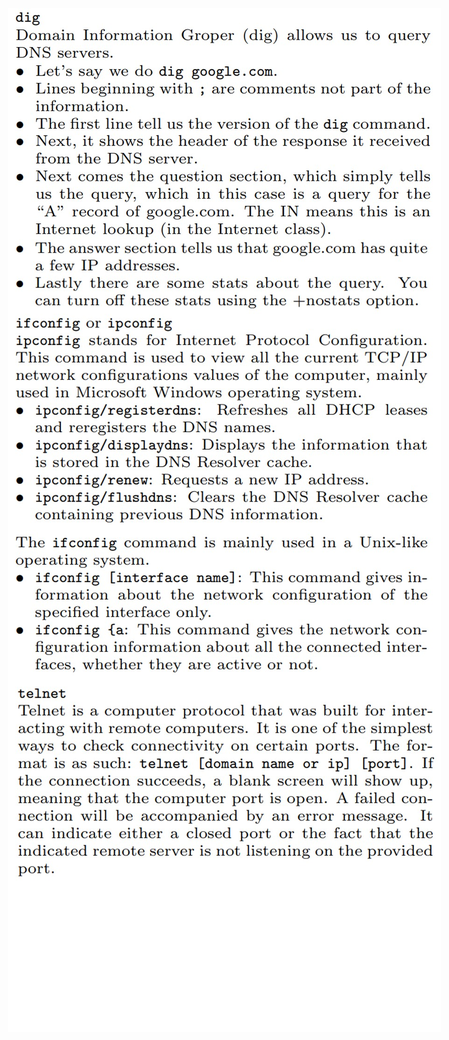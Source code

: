 \documentclass[12pt, landscape]{article}
\begin{document}
\begin{multicols*}{3}
\centerline{\includegraphics[width=0.90\linewidth]{command2}}

\end{multicols*}
\end{document}
